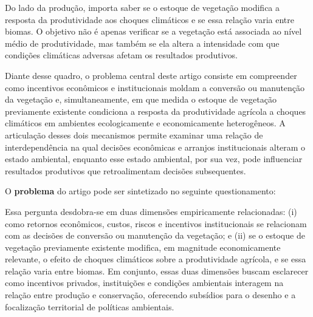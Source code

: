 Do lado da produção, importa saber se o estoque de vegetação modifica a resposta da produtividade aos choques climáticos e se essa relação varia entre biomas. O objetivo não é apenas verificar se a vegetação está associada ao nível médio de produtividade, mas também se ela altera a intensidade com que condições climáticas adversas afetam os resultados produtivos.


Diante desse quadro, o problema central deste artigo consiste em compreender como incentivos econômicos e institucionais moldam a conversão ou manutenção da vegetação e, simultaneamente, em que medida o estoque de vegetação previamente existente condiciona a resposta da produtividade agrícola a choques climáticos em ambientes ecologicamente e economicamente heterogêneos. A articulação desses dois mecanismos permite examinar uma relação de interdependência na qual decisões econômicas e arranjos institucionais alteram o estado ambiental, enquanto esse estado ambiental, por sua vez, pode influenciar resultados produtivos que retroalimentam decisões subsequentes. 

O \textbf{problema} do artigo pode ser sintetizado no seguinte questionamento: 


\medskip

Essa pergunta desdobra-se em duas dimensões empiricamente relacionadas: (i) como retornos econômicos, custos, riscos e incentivos institucionais se relacionam com as decisões de conversão ou manutenção da vegetação; e (ii) se o estoque de vegetação previamente existente modifica, em magnitude economicamente relevante, o efeito de choques climáticos sobre a produtividade agrícola, e se essa relação varia entre biomas. Em conjunto, essas duas dimensões buscam esclarecer como incentivos privados, instituições e condições ambientais interagem na relação entre produção e conservação, oferecendo subsídios para o desenho e a focalização territorial de políticas ambientais.



